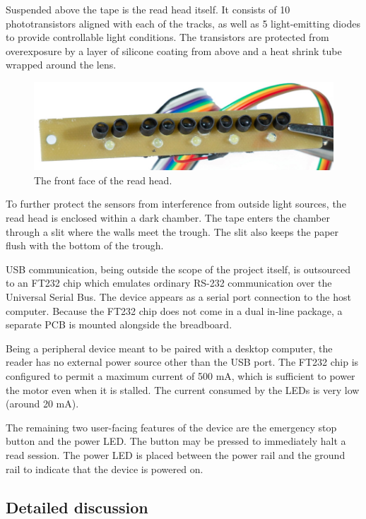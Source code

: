 \documentclass{article}
\begin{document}
	\newpage
	
	Suspended above the tape is the read head itself. It consists of 10
	phototransistors aligned with each of the tracks, as well as 5
	light-emitting diodes to provide controllable light conditions. The
	transistors are protected from overexposure by a layer of silicone coating
	from above and a heat shrink tube wrapped around the lens.
	
	\begin{figure}[h]
		\begin{center}
			\includegraphics[width=0.75\linewidth]{img/readhead}
			\caption{The front face of the read head.}
			\label{fig:readhead}
		\end{center}
	\end{figure}
	
	To further protect the sensors from interference from outside light
	sources, the read head is enclosed within a dark chamber. The tape enters
	the chamber through a slit where the walls meet the trough. The slit also
	keeps the paper flush with the bottom of the trough.
	
	USB communication, being outside the scope of the project itself, is
	outsourced to an FT232 chip which emulates ordinary RS-232 communication
	over the Universal Serial Bus. The device appears as a serial port
	connection to the host computer. Because the FT232 chip does not come in a
	dual in-line package, a separate PCB is mounted alongside the breadboard.
	
	Being a peripheral device meant to be paired with a desktop computer, the
	reader has no external power source other than the USB port. The FT232 chip
	is configured to permit a maximum current of 500 mA, which is sufficient to
	power the motor even when it is stalled. The current consumed by the LEDs
	is very low (around 20 mA).
	
	The remaining two user-facing features of the device are the emergency stop
	button and the power LED. The button may be pressed to immediately halt a
	read session. The power LED is placed between the power rail and the ground
	rail to indicate that the device is powered on.
	
	\subsection{Detailed discussion}
	
\end{document}
